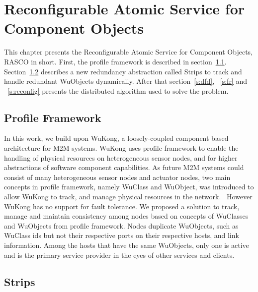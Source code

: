 \cleardoublepage
\singlespacing
\chapter{Reconfigurable Atomic Service for Component Objects}
\label{c:rasco}
\doublespacing\nointerlineskip

This chapter presents the Reconfigurable Atomic Service for Component Objects,
RASCO in short. First, the profile framework is described in section~\ref{s:pf}.
Section~\ref{s:ss} describes a new redundancy abstraction called Strips
to track and handle redundant WuObjects dynamically. After that section~\ref{s:dfd}, ~\ref{s:fr} and ~\ref{s:reconfig} presents the distributed algorithm used to
solve the problem. %

\section{Profile Framework}
\label{s:pf}

In this work, we build upon WuKong, a loosely-coupled component based
architecture for M2M systems. WuKong uses profile
framework to enable the handling of physical resources on heterogeneous sensor
nodes, and for higher abstractions of software component capabilities. As
future M2M systems could consist of many heterogeneous sensor nodes and
actuator nodes, two main concepts in profile framework, namely WuClass and
WuObject, was introduced to allow WuKong to track, and manage physical
resources in the network.~\cite{Reijers} However WuKong has no support for
fault tolerance. We proposed a solution to track, manage and maintain
consistency among nodes based on concepts of WuClasses and WuObjects from
profile framework. Nodes duplicate WuObjects, such as WuClass ids but not
their respective ports on their respective hosts, and link information. Among
the hosts that have the same WuObjects, only one is active and is the primary
service provider in the eyes of other services and clients.

\section{Strips} %
\label{s:ss}

